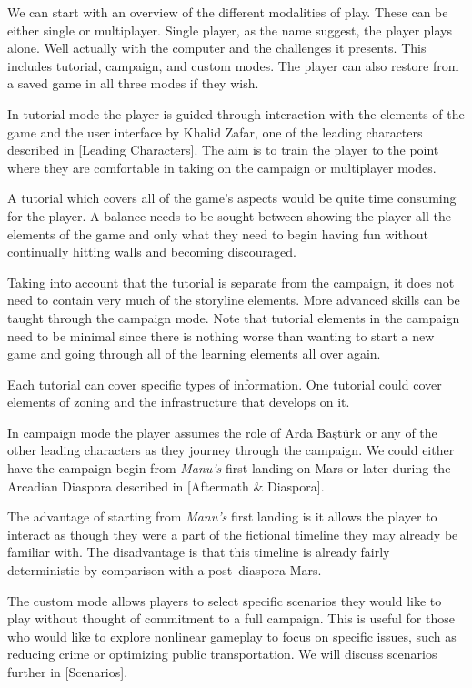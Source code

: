 
We can start with an overview of the different modalities of play. These can be either single or multiplayer. Single player, as the name suggest, the player plays alone. Well actually with the computer and the challenges it presents. This includes tutorial, campaign, and custom modes. The player can also restore from a saved game in all three modes if they wish.

In tutorial mode the player is guided through interaction with the elements of the game and the user interface by Khalid Zafar, one of the leading characters described in [Leading Characters]. The aim is to train the player to the point where they are comfortable in taking on the campaign or multiplayer modes.

A tutorial which covers all of the game's aspects would be quite time consuming for the player. A balance needs to be sought between showing the player all the elements of the game and only what they need to begin having fun without continually hitting walls and becoming discouraged.

Taking into account that the tutorial is separate from the campaign, it does not need to contain very much of the storyline elements. More advanced skills can be taught through the campaign mode. Note that tutorial elements in the campaign need to be minimal since there is nothing worse than wanting to start a new game and going through all of the learning elements all over again.

Each tutorial can cover specific types of information. One tutorial could cover elements of zoning and the infrastructure that develops on it.

In campaign mode the player assumes the role of Arda Baştürk or any of the other leading characters as they journey through the campaign. We could either have the campaign begin from {\it Manu's} first landing on Mars or later during the Arcadian Diaspora described in [Aftermath & Diaspora]. 

The advantage of starting from {\it Manu's} first landing is it allows the player to interact as though they were a part of the fictional timeline they may already be familiar with. The disadvantage is that this timeline is already fairly deterministic by comparison with a post--diaspora Mars.


The custom mode allows players to select specific scenarios they would like to play without thought of commitment to a full campaign. This is useful for those who would like to explore nonlinear gameplay to focus on specific issues, such as reducing crime or optimizing public transportation. We will discuss scenarios further in [Scenarios].

